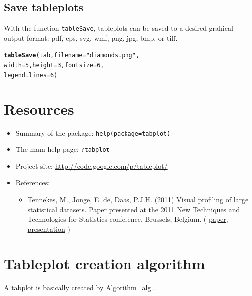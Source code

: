 \documentclass[11pt, fleqn, a4paper]{article}\usepackage{graphicx, color}
\makeatletter
\newcommand{\hlfunctioncall}[1]{\textcolor[rgb]{0.501960784313725,0,0.329411764705882}{\textbf{#1}}}%
\newcommand{\hlstring}[1]{\textcolor[rgb]{0.6,0.6,1}{#1}}%
\newenvironment{kframe}{%
 \def\at@end@of@kframe{}%
 \ifinner\ifhmode%
  \def\at@end@of@kframe{\end{minipage}}%
  \begin{minipage}{\columnwidth}%
 \fi\fi%
 \def\FrameCommand##1{\hskip\@totalleftmargin \hskip-\fboxsep
 \colorbox{shadecolor}{##1}\hskip-\fboxsep
     \hskip-\linewidth \hskip-\@totalleftmargin \hskip\columnwidth}%
 \MakeFramed {\advance\hsize-\width
   \@totalleftmargin\z@ \linewidth\hsize
   \@setminipage}}%
 {\par\unskip\endMakeFramed%
 \at@end@of@kframe}
\newenvironment{knitrout}{}{} %
\makeatother
\begin{document}
\subsection{Save tableplots}\label{secsave}

With the function {\tt tableSave}, tableplots can be saved to a desired grahical output format: pdf, eps, svg, wmf, png, jpg, bmp, or tiff.

\begin{knitrout}
\color{fgcolor}\begin{kframe}
\begin{alltt}
\hlfunctioncall{tableSave}(tab, filename = \hlstring{"diamonds.png"}, 
    width = 5, height = 3, fontsize = 6, 
    legend.lines = 6)
\end{alltt}
\end{kframe}
\end{knitrout}



\newpage

\section*{Resources}

\begin{itemize}
\item Summary of the package: {\tt help(package=tabplot)}
\item The main help page: {\tt ?tabplot}
\item Project site: \url{http://code.google.com/p/tableplot/}
\item References:
\begin{itemize}
\item Tennekes, M., Jonge, E. de, Daas, P.J.H. (2011) Visual profiling of large statistical datasets. Paper presented at the 2011 New Techniques and Technologies for Statistics conference, Brussels, Belgium. (
\href{http://www.von-tijn.nl/tijn/research/publications/Tableplots.pdf}{paper}, 
\href{http://www.von-tijn.nl/tijn/research/presentations/NTTS_tableplots.pdf}{presentation}
)
\end{itemize}
\end{itemize}


\appendix
\newpage
\section{Tableplot creation algorithm}\label{secalg}
A tabplot is basically created by Algorithm~\ref{alg}.
\end{document}
